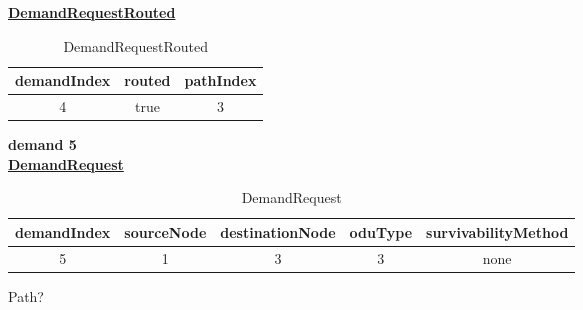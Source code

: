 \underline{\textbf{DemandRequestRouted}}

\begin{table}[H]
	\centering
	\begin{tabular}{| c | c | c |}
		\hline
		\textbf{demandIndex} & \textbf{routed}  & \textbf{pathIndex}\\ \hline
		4                    & true             & 3                 \\ \hline
	\end{tabular}
	\caption{DemandRequestRouted}
	\label{demand_request_routed}
\end{table}

\textbf{demand 5}\\

\underline{\textbf{DemandRequest}}

\begin{table}[H]
	\centering
	\begin{tabular}{| c | c | c | c | c |}
		\hline
		\textbf{demandIndex} & \textbf{sourceNode} & \textbf{destinationNode} & \textbf{oduType} & \textbf{survivabilityMethod}\\ \hline
		5                    & 1                   & 3                        & 3                & none						   \\ \hline
	\end{tabular}
	\caption{DemandRequest}
	\label{demand_request}
\end{table}

Path?\\

\begin{table}[H]
	\centering
	\caption{paths}
	\label{paths}
\end{table}

